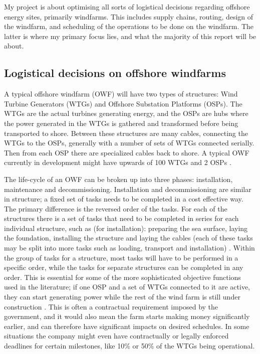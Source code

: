 \documentclass[a4paper,12pt]{article}
\begin{document}
My project is about optimising all sorts of logistical decisions regarding offshore energy sites, primarily windfarms. This includes supply chains, routing, design of the windfarm, and scheduling of the operations to be done on the windfarm. The latter is where my primary focus lies, and what the majority of this report will be about. 

\subsection{Logistical decisions on offshore windfarms} \label{ss:logdec}
A typical offshore windfarm (OWF) will have two types of structures: Wind Turbine Generators (WTGs) and Offshore Substation Platforms (OSPs). The WTGs are the actual turbines generating energy, and the OSPs are hubs where the power generated in the WTGs is gathered and transformed before being transported to shore. Between these structures are many cables, connecting the WTGs to the OSPs, generally with a number of sets of WTGs connected serially. Then from each OSP there are specialized cables back to shore. A typical OWF currently in development might have upwards of 100 WTGs and 2 OSPs \cite{ruk2017,barlow2018mixed}. 

The life-cycle of an OWF can be broken up into three phases: installation, maintenance and decommissioning. Installation and decommissioning are similar in structure; a fixed set of tasks needs to be completed in a cost effective way. The primary difference is the reversed order of the tasks. For each of the structures there is a set of tasks that need to be completed in series for each individual structure, such as (for installation): preparing the sea surface, laying the foundation, installing the structure and laying the cables (each of these tasks may be split into more tasks such as loading, transport and installation) \cite{kerkhove2017optimised}. Within the group of tasks for a structure, most tasks will have to be performed in a specific order, while the tasks for separate structures can be completed in any order. This is essential for some of the more sophisticated objective functions used in the literature; if one OSP and a set of WTGs connected to it are active, they can start generating power while the rest of the wind farm is still under construction \cite{barlow2017using}. This is often a contractual requirement imposed by the government, and it would also mean the farm starts making money significantly earlier, and can therefore have significant impacts on desired schedules. In some situations the company might even have contractually or legally enforced deadlines for certain milestones, like 10\% or 50\% of the WTGs being operational. 
\end{document}
